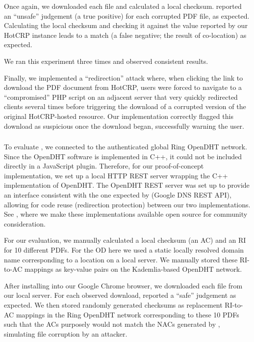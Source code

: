 Once again, we downloaded each file and calculated a local checksum. \DNSSYS{}
reported an ``unsafe'' judgement (a true positive) for each corrupted PDF file,
as expected. Calculating the local checksum and checking it against the value
reported by our HotCRP instance leads to a match (a false negative; \ie the
result of co-location) as expected.

We ran this experiment three times and observed consistent results.

Finally, we implemented a ``redirection'' attack where, when clicking the link
to download the PDF document from HotCRP, users were forced to navigate to a
``compromised'' PHP script on an adjacent server that very quickly redirected
clients several times before triggering the download of a corrupted version of
the original HotCRP-hosted resource. Our implementation correctly flagged this
download as suspicious once the download began, successfully warning the user.

\subsubsection{\DHTSYS{}}

To evaluate \DHTSYS{}, we connected to the authenticated global Ring OpenDHT
network. Since the OpenDHT software is implemented in C++, it could not be
included directly in a JavaScript plugin. Therefore, for our proof-of-concept
implementation, we set up a local HTTP REST server wrapping the C++
implementation of OpenDHT. The OpenDHT REST server was set up to provide an
interface consistent with the one expected by \DNSSYS{} (\ie Google DNS REST
API), allowing for code reuse (\eg redirection protection) between our two
implementations. See , where we make these implementations
available open source for community consideration.

For our evaluation, we manually calculated a local checksum (\ie an AC) and an
RI for 10 different \CONFERENCE{} PDFs. For the OD here we used a static locally
resolved domain name corresponding to a location on a local server. We manually
stored these RI-to-AC mappings as key-value pairs on the Kademlia-based OpenDHT
network.

After installing \DHTSYS{} into our Google Chrome browser, we downloaded each
file from our local server. For each observed download, \DHTSYS{} reported a
``safe'' judgement as expected. We then stored randomly generated checksums as
replacement RI-to-AC mappings in the Ring OpenDHT network corresponding to these
10 PDFs such that the ACs purposely would not match the NACs generated by
\DHTSYS{}, simulating file corruption by an attacker.

